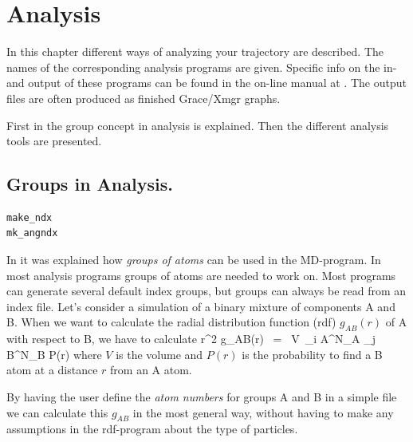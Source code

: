 %
% 
% 
% 
% 
% 
% 
% 
% 
%

\chapter{Analysis}
\label{ch:analysis}
In this chapter different ways of analyzing your trajectory are described. 
The names of the corresponding analysis programs are given. 
Specific info on the in- and output of these programs can be found 
in the on-line manual at {\wwwpage}.
The output files are often produced as finished Grace/Xmgr graphs.

First in  the group concept in analysis is explained. 
Then the different analysis tools are presented.


\section{Groups in Analysis.}
\label{sec:groups}
\begin{verbatim}
make_ndx
mk_angndx
\end{verbatim}
In  it was explained how {\em groups of
atoms} can be used in the MD-program.  In most analysis programs groups
of atoms are needed to work on. Most programs can generate several default
index groups, but groups can always be read from an index file. Let's
consider a simulation of a binary mixture of components A and B. When
we want to calculate the radial distribution function (rdf)
$g_{AB}(r)$ of A with respect to B, we have to calculate
\pi r^2 g_{AB}(r)      ~=~     V~\sum_{i \in A}^{N_A} \sum_{j \in B}^{N_B} P(r)
\eeq
where $V$ is the volume and $P(r)$ is the probability to find a B atom
at a distance $r$ from an A atom.

By having the user define the {\em atom numbers} for groups A and B in
a simple file we can calculate this $g_{AB}$ in the most general way, without
having to make any assumptions in the rdf-program about the type of 
particles. 

